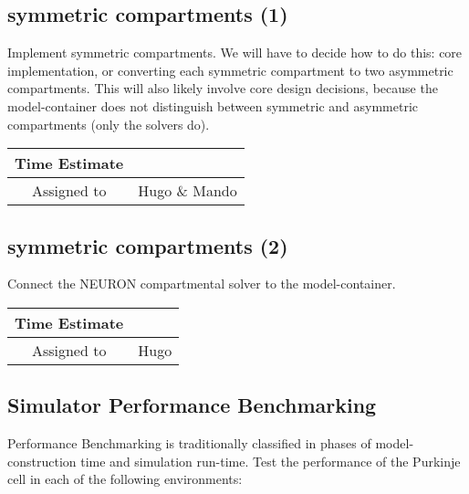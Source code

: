 \documentclass[12pt]{article}
\begin{document}
\subsection{symmetric compartments (1)}

Implement symmetric compartments.  We will have to decide how to do
this: core implementation, or converting each symmetric compartment to
two asymmetric compartments.  This will also likely involve core
design decisions, because the model-container does not distinguish
between symmetric and asymmetric compartments (only the solvers do).

\begin{center}
  \vspace{5mm}
  \centering
  \begin{tabular}{|c|c|}
    \hline
    Time Estimate
    & \\
    \hline
    Assigned to
    & Hugo \& Mando \\
    \hline
  \end{tabular}
\end{center}


\subsection{symmetric compartments (2)}

Connect the NEURON compartmental solver to the model-container.

\begin{center}
  \vspace{5mm}
  \centering
  \begin{tabular}{|c|c|}
    \hline
    Time Estimate
    & \\
    \hline
    Assigned to
    & Hugo \\
    \hline
  \end{tabular}
\end{center}


\subsection{Simulator Performance Benchmarking}

Performance Benchmarking is traditionally classified in phases of
model-construction time and simulation run-time.  Test the performance
of the Purkinje cell in each of the following environments:
\end{document}
